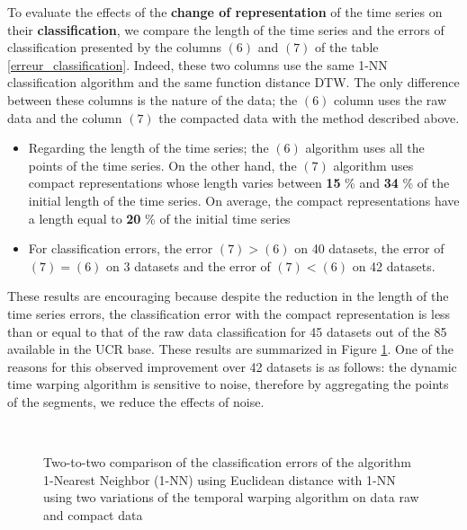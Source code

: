 To evaluate the effects of the \textbf{change of representation} of the time series on their
\textbf{classification}, we compare the length of the time series and the errors of
classification presented by the columns $ (6) $ and $ (7) $ of the table  \ref{erreur_classification}.
Indeed, these two columns use the same 1-NN classification algorithm and the same function
distance DTW. The only difference between these columns is the nature of the data; the $ (6) $ column
uses the raw data and the column $ (7) $ the compacted data with the method described above.

\begin{itemize}
\item Regarding the length of the time series; the $ (6) $ algorithm uses all the points of
the time series. On the other hand, the $ (7) $ algorithm uses compact representations whose
length varies between \textbf{15} \% and \textbf{34} \% of the initial length of the time series.
On average, the compact representations have a length equal to \textbf {20} \% of the initial time series
\item For classification errors, the error $ (7)> (6) $ on 40 datasets,
the error of $ (7) = (6) $ on 3 datasets and the error of $ (7) <(6) $ on 42 datasets.
\end {itemize}

 These results are encouraging because despite the reduction in the length of the time series
 errors, the classification error with the compact representation is less than or equal to
that of the raw data classification for 45 datasets out of the 85 available in the
UCR base. These results are summarized in Figure \ref{synthesis}. One of the reasons for this observed improvement over 42 datasets is as follows: the dynamic time warping algorithm  is sensitive to noise, therefore by aggregating the points of the segments, we reduce the effects of noise.



\begin{figure}
\center
{}
\\

\caption{Two-to-two comparison of the classification errors of the algorithm
1-Nearest Neighbor (1-NN) using Euclidean distance with 1-NN using two variations of the temporal warping algorithm on data
raw and compact data}

\label{synthesis}

\end{figure}



